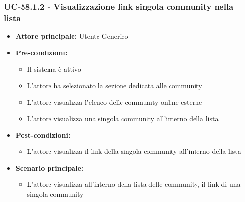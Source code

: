 \documentclass[a4paper,12pt]{article}
\begin{document}
\subsubsection{UC-58.1.2 - Visualizzazione link singola community nella lista} \label{subsec:UC-58.1.2}
\begin{itemize}
    \item \textbf{Attore principale:} Utente Generico
    \item \textbf{Pre-condizioni:} 
    \begin{itemize}
        \item Il sistema è attivo
        \item L'attore ha selezionato la sezione dedicata alle community
        \item L'attore visualizza l'elenco delle community online esterne
        \item L'attore visualizza una singola community all'interno della lista
    \end{itemize}
    \item \textbf{Post-condizioni:}
    \begin{itemize}
        \item L'attore visualizza il link della singola community all'interno della lista
    \end{itemize}
    \item \textbf{Scenario principale:} 
    \begin{itemize}
        \item L'attore visualizza all'interno della lista delle community, il link di una singola community
    \end{itemize}
\end{itemize}
\end{document}
